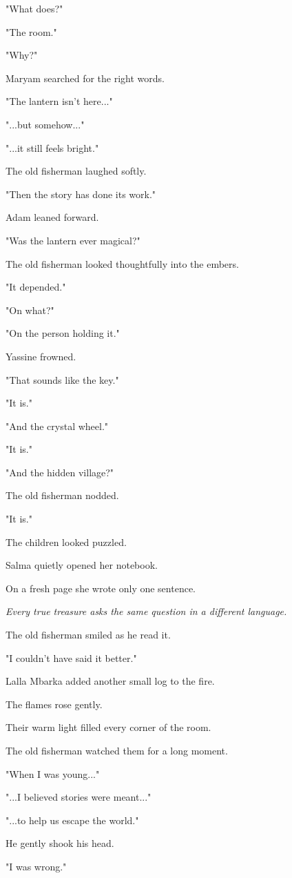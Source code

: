 \documentclass[12pt,openany]{book}
\begin{document}
"What does?"

"The room."

"Why?"

Maryam searched for the right words.

"The lantern isn't here..."

"...but somehow..."

"...it still feels bright."

The old fisherman laughed softly.

"Then the story has done its work."

Adam leaned forward.

"Was the lantern ever magical?"

The old fisherman looked thoughtfully into the embers.

"It depended."

"On what?"

"On the person holding it."

Yassine frowned.

"That sounds like the key."

"It is."

"And the crystal wheel."

"It is."

"And the hidden village?"

The old fisherman nodded.

"It is."

The children looked puzzled.

Salma quietly opened her notebook.

On a fresh page she wrote only one sentence.

\emph{Every true treasure asks the same question in a different language.}

The old fisherman smiled as he read it.

"I couldn't have said it better."

Lalla Mbarka added another small log to the fire.

The flames rose gently.

Their warm light filled every corner of the room.

The old fisherman watched them for a long moment.

"When I was young..."

"...I believed stories were meant..."

"...to help us escape the world."

He gently shook his head.

"I was wrong."
\end{document}
